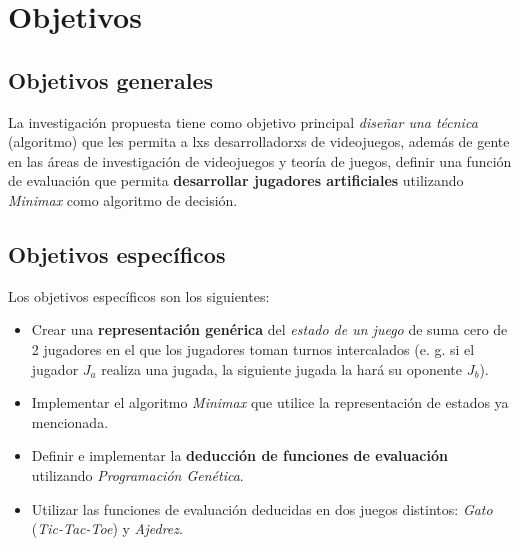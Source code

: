 \section{Objetivos}
  \subsection{Objetivos generales}
    La investigación propuesta tiene como objetivo principal \textit{diseñar una técnica} 
    (algoritmo) que les permita a lxs desarrolladorxs de videojuegos, además de gente en las 
    áreas de investigación de videojuegos y teoría de juegos, definir una función de evaluación que 
    permita \textbf{desarrollar jugadores artificiales} utilizando \textit{Minimax} como algoritmo de decisión.
    
  \subsection{Objetivos específicos}
    Los objetivos específicos son los siguientes:
    
    \begin{itemize}
      \item Crear una \textbf{representación genérica} del \textit{estado de un juego} de suma cero
            de 2 jugadores en el que los jugadores toman turnos intercalados (e. g. si el jugador 
            \(J_a\) realiza una jugada, la siguiente jugada la hará su oponente \(J_b\)). 
      \item Implementar el algoritmo \textit{Minimax} que utilice la representación de estados ya 
        mencionada.
      \item Definir e implementar la \textbf{deducción de funciones de evaluación} utilizando 
        \textit{Programación Genética}.
      \item Utilizar las funciones de evaluación deducidas en dos juegos distintos: \textit{Gato} 
        (\textit{Tic-Tac-Toe}) y \textit{Ajedrez}.
    \end{itemize}